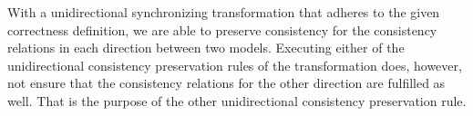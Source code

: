 With a unidirectional synchronizing transformation that adheres to the given correctness definition, we are able to preserve consistency for the consistency relations in each direction between two models.
Executing either of the unidirectional consistency preservation rules of the transformation does, however, not ensure that the consistency relations for the other direction are fulfilled as well.
That is the purpose of the other unidirectional consistency preservation rule.


